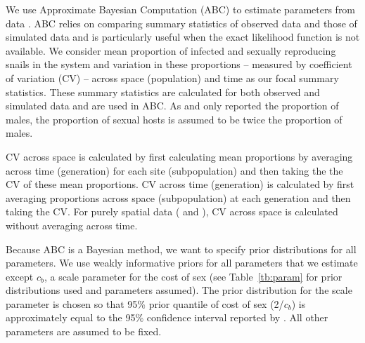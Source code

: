 \documentclass{article}\usepackage[]{graphicx}\usepackage[]{color}
\begin{document}
We use Approximate Bayesian Computation (ABC) to estimate parameters from data \citep{toni2009approximate}.
ABC relies on comparing summary statistics of observed data and those of simulated data and is particularly useful when the exact likelihood function is not available.
We consider mean proportion of infected and sexually reproducing snails in the system and variation in these proportions -- measured by coefficient of variation (CV) -- across space (population) and time as our focal summary statistics.
These summary statistics are calculated for both observed and simulated data and are used in ABC.
As \cite{dagan2013clonal} and \cite{mckone2016fine} only reported the proportion of males, the proportion of sexual hosts is assumed to be twice the proportion of males.

CV across space is calculated by first calculating mean proportions by averaging across time (generation) for each site (subpopulation) and then taking the the CV of these mean proportions.
CV across time (generation) is calculated by first averaging proportions across space (subpopulation) at each generation and then taking the CV.
For purely spatial data (\cite{dagan2013clonal} and \cite{mckone2016fine}), CV across space is calculated without averaging across time.

Because ABC is a Bayesian method, we want to specify prior distributions for all parameters.
We use weakly informative priors for all parameters that we estimate except $c_b$, a scale parameter for the cost of sex (see Table~\ref{tb:param} for prior distributions used and parameters assumed).
The prior distribution for the scale parameter is chosen so that 95\% prior quantile of cost of sex (2/$c_b$) is approximately equal to the 95\% confidence interval reported by \cite{gibson2017two}.
All other parameters are assumed to be fixed.
\end{document}
